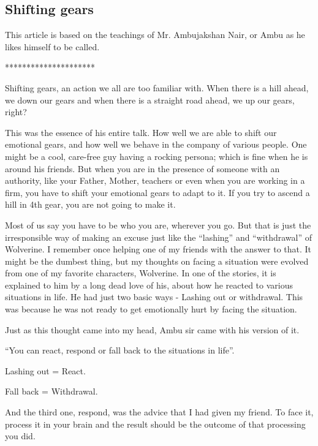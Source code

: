 \documentclass[twoside,11pt,titlepage]{article}
\begin{document}
\newpage
\begin{center}
  \section{Shifting gears}
\end{center}
\bigskip
\bigskip
\bigskip

This article is based on the teachings of Mr. Ambujakshan Nair, or Ambu as he likes himself to be called.

\bigskip
\begin{center}
*********************
\end{center}

Shifting gears, an action we all are too familiar with. When there is a hill ahead, we down our gears and when there is a straight road ahead, we up our gears, right?

This was the essence of his entire talk. How well we are able to shift our emotional gears, and how well we behave in the company of various people. One might be a cool, care-free guy having a rocking persona; which is fine when he is around his friends. But when you are in the presence of someone with an authority, like your Father, Mother, teachers or even when you are working in a firm, you have to shift your emotional gears to adapt to it. If you try to ascend a hill in 4th gear, you are not going to make it.

Most of us say you have to be who you are, wherever you go. But that is just the irresponsible way of making an excuse just like the ``lashing'' and ``withdrawal'' of Wolverine. I remember once helping one of my friends with the answer to that. It might be the dumbest thing, but my thoughts on facing a situation were evolved from one of my favorite characters, Wolverine. In one of the stories, it is explained to him by a long dead love of his, about how he reacted to various situations in life. He had just two basic ways - Lashing out or withdrawal. This was because he was not ready to get emotionally hurt by facing the situation.

Just as this thought came into my head, Ambu sir came with his version of it.

``You can react, respond or fall back to the situations in life''.

Lashing out = React.

Fall back = Withdrawal.

And the third one, respond, was the advice that I had given my friend. To face it, process it in your brain and the result should be the outcome of that processing you did.
\end{document}
